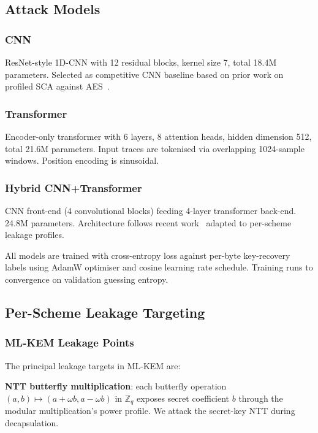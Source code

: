 \documentclass[sigconf,nonacm]{acmart}
\begin{document}
\subsection{Attack Models}

\subsubsection{CNN}

ResNet-style 1D-CNN with 12 residual blocks, kernel size 7, total 18.4M
parameters. Selected as competitive CNN baseline based on prior work on
profiled SCA against AES~\cite{zaid2020cnn,perin2024sca}.

\subsubsection{Transformer}

Encoder-only transformer with 6 layers, 8 attention heads, hidden
dimension 512, total 21.6M parameters. Input traces are tokenised via
overlapping 1024-sample windows. Position encoding is sinusoidal.

\subsubsection{Hybrid CNN+Transformer}

CNN front-end (4 convolutional blocks) feeding 4-layer transformer
back-end. 24.8M parameters. Architecture follows recent
work~\cite{wu2024hybridsca} adapted to per-scheme leakage profiles.

All models are trained with cross-entropy loss against per-byte
key-recovery labels using AdamW optimiser and cosine learning rate
schedule. Training runs to convergence on validation guessing entropy.

\subsection{Per-Scheme Leakage Targeting}

\subsubsection{ML-KEM Leakage Points}

The principal leakage targets in ML-KEM are:

\textbf{NTT butterfly multiplication}: each butterfly operation
$(a,b) \mapsto (a + \omega b, a - \omega b)$ in $\mathbb{Z}_q$ exposes
secret coefficient $b$ through the modular multiplication's power
profile. We attack the secret-key NTT during decapsulation.
\end{document}
